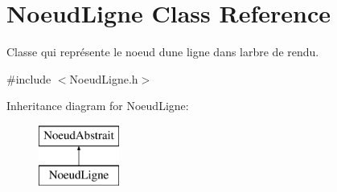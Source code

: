 \hypertarget{class_noeud_ligne}{}\section{Noeud\+Ligne Class Reference}
\label{class_noeud_ligne}


Classe qui représente le noeud d\textquotesingle{}une ligne dans l\textquotesingle{}arbre de rendu.  




{\ttfamily \#include $<$Noeud\+Ligne.\+h$>$}

Inheritance diagram for Noeud\+Ligne\+:\begin{figure}[H]
\begin{center}
\leavevmode
\includegraphics[height=2.000000cm]{class_noeud_ligne}
\end{center}
\end{figure}
